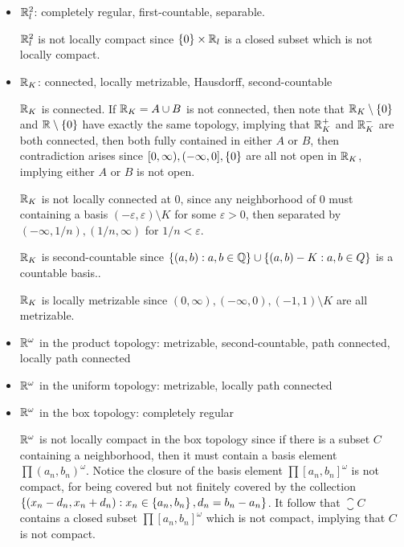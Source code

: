 \documentclass[12pt,a4paper]{article}
\begin{document}
\begin{ex}
\begin{itemize}
            \item $\mathbb{R}_l^2$: completely regular, first-countable, separable.
            \begin{remark}
                $\mathbb{R}_l^2$ is not locally compact since $\left\{0\right\}\times\mathbb{R}_l$ is a closed subset which is not locally compact. 
            \end{remark}
            \item $\mathbb{R}_K$: connected, locally metrizable, Hausdorff, second-countable
            \begin{remark}
                $\mathbb{R}_K$ is connected. If $\mathbb{R}_K=A\cup B$ is not connected, then note that $\mathbb{R}_K\setminus\left\{0\right\}$ and $\mathbb{R}\setminus\left\{0\right\}$ have exactly the same topology, implying that $\mathbb{R}_K^+$ and $\mathbb{R}_K^-$ are both connected, then both fully contained in either $A$ or $B$, then contradiction arises since $[0,\infty),(-\infty,0],\left\{0\right\}$ are all not open in $\mathbb{R}_K$, implying either $A$ or $B$ is not open.

                $\mathbb{R}_K$ is not locally connected at $0$, since any neighborhood of $0$ must containing a basis $(-\varepsilon,\varepsilon)\setminus K$ for some $\varepsilon>0$, then separated by $(-\infty,1/n),(1/n,\infty)$ for $1/n<\varepsilon$. 

                $\mathbb{R}_K$ is second-countable since $\left\{(a,b):a,b\in\mathbb{Q}\right\} \cup \left\{(a,b)-K:a,b\in Q\right\}$ is a countable basis..

                $\mathbb{R}_K$ is locally metrizable since $(0,\infty),(-\infty,0),(-1,1)\setminus K$ are all metrizable.
            \end{remark}
            \item $\mathbb{R}^\omega$ in the product topology: metrizable, second-countable, path connected, locally path connected
            \item $\mathbb{R}^\omega$ in the uniform topology: metrizable, locally path connected
            \item $\mathbb{R}^\omega$ in the box topology: completely regular
            \begin{remark}
                $\mathbb{R}^\omega$ is not locally compact in the box topology since if there is a subset $C$ containing a neighborhood, then it must contain a basis element $\prod(a_n,b_n)^\omega$. Notice the closure of the basis element $\prod[a_n,b_n]^\omega$ is not compact, for being covered but not finitely covered by the collection $\left\{(x_n-d_n,x_n+d_n):x_n\in\left\{a_n,b_n\right\},d_n=b_n-a_n\right\}$. It follow that $\closure{C}$ contains a closed subset $\prod[a_n,b_n]^\omega$ which is not compact, implying that $C$ is not compact.
                

\end{remark}
\end{itemize}
\end{ex}
\end{document}
